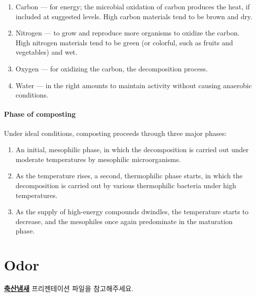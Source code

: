 \documentclass[]{book}
\providecommand{\tightlist}{%
  \setlength{\itemsep}{0pt}\setlength{\parskip}{0pt}}
\begin{document}
\begin{enumerate}
\def\labelenumi{\arabic{enumi}.}
\tightlist
\item
  Carbon --- for energy; the microbial oxidation of carbon produces the
  heat, if included at suggested levels. High carbon materials tend to
  be brown and dry.
\item
  Nitrogen --- to grow and reproduce more organisms to oxidize the
  carbon. High nitrogen materials tend to be green (or colorful, such as
  fruits and vegetables) and wet.
\item
  Oxygen --- for oxidizing the carbon, the decomposition process.
\item
  Water --- in the right amounts to maintain activity without causing
  anaerobic conditions.
\end{enumerate}

\subsubsection{Phase of composting}\label{phase-of-composting}

Under ideal conditions, composting proceeds through three major phases:

\begin{enumerate}
\def\labelenumi{\arabic{enumi}.}
\tightlist
\item
  An initial, mesophilic phase, in which the decomposition is carried
  out under moderate temperatures by mesophilic microorganisms.
\item
  As the temperature rises, a second, thermophilic phase starts, in
  which the decomposition is carried out by various thermophilic
  bacteria under high temperatures.
\item
  As the supply of high-energy compounds dwindles, the temperature
  starts to decrease, and the mesophiles once again predominate in the
  maturation phase.
\end{enumerate}

\chapter{Odor}\label{odor}

\textbf{\href{https://drive.google.com/open?id=1Hze2tdsbKGxIF02kD9K_9p8RFX9vLFoE}{축산냄새}}
프리젠테이션 파일을 참고해주세요.


\end{document}
